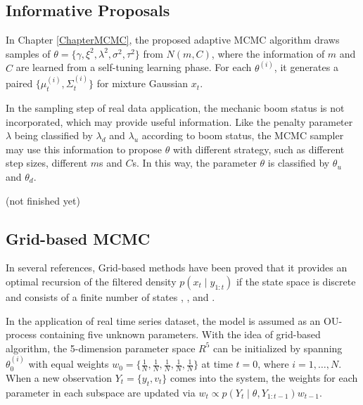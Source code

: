 \subsection*{Informative Proposals}

In Chapter \ref{ChapterMCMC}, the proposed adaptive MCMC algorithm draws samples of $\theta=\{\gamma,\xi^2,\lambda^2,\sigma^2,\tau^2\}$ from $N(m,C)$, where the information of $m$ and $C$ are learned from a self-tuning learning phase. For each $\theta^{(i)}$, it generates a paired $\{\mu_t^{(i)},\Sigma_t^{(i)}\}$ for mixture Gaussian $x_t$. 

In the sampling step of real data application, the mechanic boom status is not incorporated, which may provide useful information. Like the penalty parameter $\lambda$ being classified by $\lambda_d$ and $\lambda_u$ according to boom status, the MCMC sampler may use this information to propose $\theta$ with different strategy, such as different step sizes, different $m$s and $C$s. In this way, the parameter $\theta$ is classified by $\theta_u$ and $\theta_d$. 

(not finished yet)




\subsection*{Grid-based MCMC}

In several references, Grid-based methods have been proved that it provides an optimal recursion of the filtered density $p(x_t\mid y_{1:t})$ if the state space is discrete and consists of a finite number of states \cite{ristic2004beyond}, \cite{stroud2016bayesian}, \cite{arulampalam2002tutorial} and \cite{hartmann2016grid}. 

In the application of real time series dataset, the model is assumed as an OU-process containing five unknown parameters. With the idea of grid-based algorithm, the 5-dimension parameter space $\mathit{R}^5$ can be initialized by spanning $\theta_0^{(i)}$ with equal weights $w_0=\{\frac{1}{N},\frac{1}{N},\frac{1}{N},\frac{1}{N},\frac{1}{N}\}$ at time $t=0$, where $i=1,\ldots,N$. When a new observation $Y_t=\{y_t,v_t\}$ comes into the system, the weights for each parameter in each subspace are updated via $w_t\propto p(Y_t\mid \theta,Y_{1:t-1})w_{t-1}$. 

